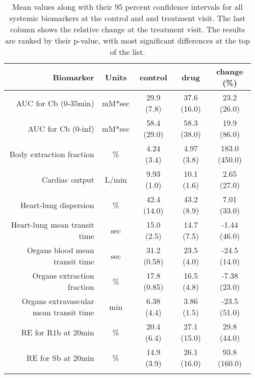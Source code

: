 \documentclass{epflreport}%
\begin{document}
\begin{longtable}{rcccc}%
\hline%
Biomarker&Units&control&drug&change (\%)\\%
\hline%
AUC for Cb (0{-}35min)&mM*sec&29.9 (7.8) &37.6 (16.0) &23.2 (26.0) \\%
AUC for Cb (0{-}inf)&mM*sec&58.4 (29.0) &58.3 (38.0) &19.9 (86.0) \\%
Body extraction fraction&\%&4.24 (3.4) &4.97 (3.8) &183.0 (450.0) \\%
Cardiac output&L/min&9.93 (1.0) &10.1 (1.6) &2.65 (27.0) \\%
Heart{-}lung dispersion&\%&42.4 (14.0) &43.2 (8.9) &7.01 (33.0) \\%
Heart{-}lung mean transit time&sec&15.0 (2.5) &14.7 (7.5) &{-}1.44 (46.0) \\%
Organs blood mean transit time&sec&31.2 (0.58) &23.5 (4.0) &{-}24.5 (14.0) \\%
Organs extraction fraction&\%&17.8 (0.85) &16.5 (4.8) &{-}7.38 (23.0) \\%
Organs extravascular mean transit time&min&6.38 (4.4) &3.86 (1.5) &{-}23.5 (51.0) \\%
RE for R1b at 20min&\%&20.4 (6.4) &27.1 (15.0) &29.8 (44.0) \\%
RE for Sb at 20min&\%&14.9 (3.9) &26.1 (16.0) &93.8 (160.0) \\%
\hline%
\caption{Mean values along with their 95 percent confidence intervals for all systemic biomarkers at the control and and treatment visit. The last column shows the relative change at the treatment visit. The results are ranked by their p-value, with most significant differences at the top of the list.} \\%
\end{longtable}%
\end{document}
